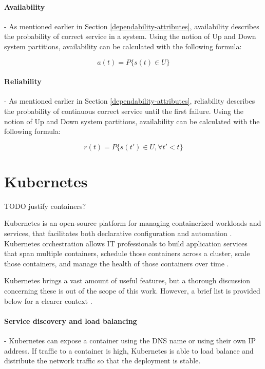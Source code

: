 \paragraph{Availability} - As mentioned earlier in Section \ref{dependability-attributes}, availability describes the probability of correct service in a system. Using the notion of Up and Down system partitions, availability can be calculated with the following formula:

\[
a(t) = P\{ s(t) \in U \}
\]

\paragraph{Reliability} - As mentioned earlier in Section \ref{dependability-attributes}, reliability describes the probability of continuous correct service until the first failure. Using the notion of Up and Down system partitions, availability can be calculated with the following formula:

\[
r(t) = P\{ s(t') \in U, \forall t' < t \}
\]


\section{Kubernetes}

TODO justify containers?

Kubernetes is an open-source platform for managing containerized workloads and services, that facilitates both declarative configuration and automation \cite{KubernetesOverview}. Kubernetes orchestration allows IT professionals to build application services that span multiple containers, schedule those containers across a cluster, scale those containers, and manage the health of those containers over time \cite{KubernetesOverviewRH}.

Kubernetes brings a vast amount of useful features, but a thorough discussion concerning these is out of the scope of this work. However, a brief list is provided below for a clearer context \cite{KubernetesOverview}.

\paragraph{Service discovery and load balancing} - Kubernetes can expose a container using the DNS name or using their own IP address. If traffic to a container is high, Kubernetes is able to load balance and distribute the network traffic so that the deployment is stable.

